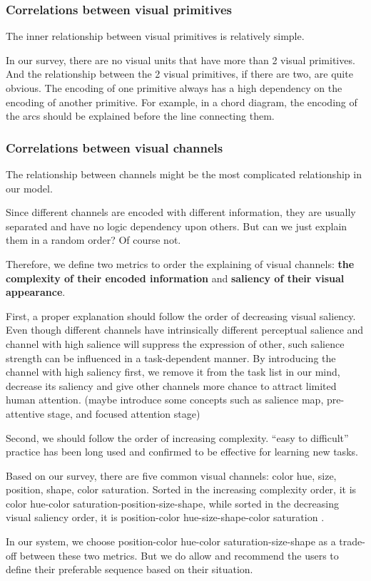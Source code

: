 \documentclass[review,journal]{vgtc}         %
\begin{document}
\subsubsection{Correlations between visual primitives}
The inner relationship between visual primitives is relatively simple.\par
In our survey, there are no visual units that have more than 2 visual primitives. And the relationship between the 2 visual primitives, if there are two, are quite obvious. The encoding of one primitive always has a high dependency on the encoding of another primitive. For example, in a chord diagram, the encoding of the arcs should be explained before the line connecting them. \par
\subsubsection{Correlations between visual channels}
The relationship between channels might be the most complicated relationship in our model. \par
Since different channels are encoded with different information, they are usually separated and have no logic dependency upon others. But can we just explain them in a random order?
Of course not.\par
Therefore, we define two metrics to order the explaining of visual channels: \textbf{the complexity of their encoded information} and \textbf{saliency of their visual appearance}.\par
First, a proper explanation should follow the order of decreasing visual saliency. Even though different channels have intrinsically different perceptual salience and channel with high salience will suppress the expression of other, such salience strength can be influenced in a task-dependent manner. \cite{nothdurft_salience_2000} By introducing the channel with high saliency first, we remove it from the task list in our mind, decrease its saliency and give other channels more chance to attract limited human attention. (maybe introduce some concepts such as salience map, pre-attentive stage, and focused attention stage) \par
 Second, we should follow the order of increasing complexity. “easy to difficult” practice has been long used and confirmed to be effective for learning new tasks\cite{bliss_effects_1992}.\par
 Based on our survey, there are five common visual channels: color hue, size, position, shape, color saturation. Sorted in the increasing complexity order, it is color hue-color saturation-position-size-shape, while sorted in the decreasing visual saliency order, it is position-color hue-size-shape-color saturation \cite{munzner_visualization_2014,cleveland_graphical_1984}.  \par
In our system, we choose position-color hue-color saturation-size-shape as a trade-off between these two metrics. But we do allow and recommend the users to define their preferable sequence based on their situation. \par
\end{document}
